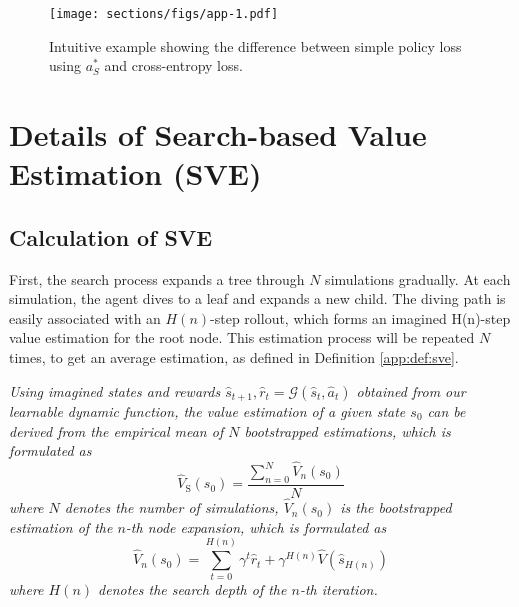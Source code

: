 \begin{figure}[h]
\centering
\texttt{[image: sections/figs/app-1.pdf]}
\caption{Intuitive example showing the difference between simple policy loss using $a^*_S$ and cross-entropy loss.}
\label{appb:simplepi}
\end{figure}



\section{Details of Search-based Value Estimation (SVE)}
\subsection{Calculation of SVE}
\label{cal_sve}
First, the search process expands a tree through $N$ simulations gradually. At each simulation, the agent dives to a leaf and expands a new child. The diving path is easily associated with an $H(n)$-step rollout, which forms an imagined H(n)-step value estimation for the root node. This estimation process will be repeated $N$ times, to get an average estimation, as defined in Definition \ref{app:def:sve}.

\begin{definition}
\label{app:def:sve}
\textit{Using imagined states and rewards $\hat{s}_{t+1}, \hat{r}_t=\mathcal{G}(\hat{s}_t,\hat{a}_t)$ obtained from our learnable dynamic function, 
the value estimation of a given state $s_0$ can be derived from the empirical mean of $N$ bootstrapped estimations, which is formulated as
}
\begin{equation}
    \hat{V}_\text{S}(s_0)=\frac{\sum_{n=0}^{N}\hat{V}_n(s_0)}{N}
\end{equation}
\textit{where $N$ denotes the number of simulations, $\hat{V}_n(s_0)$ is the bootstrapped estimation of the $n$-th node expansion, which is formulated as }
\begin{equation}            \hat{V}_n(s_0)=\sum_{t=0}^{H(n)}\gamma^t\hat{r}_t+\gamma^{H(n)}\hat{V}(\hat{s}_{H(n)})
\end{equation}
\textit{where $H(n)$ denotes the search depth of the $n$-th iteration.}
\end{definition}

